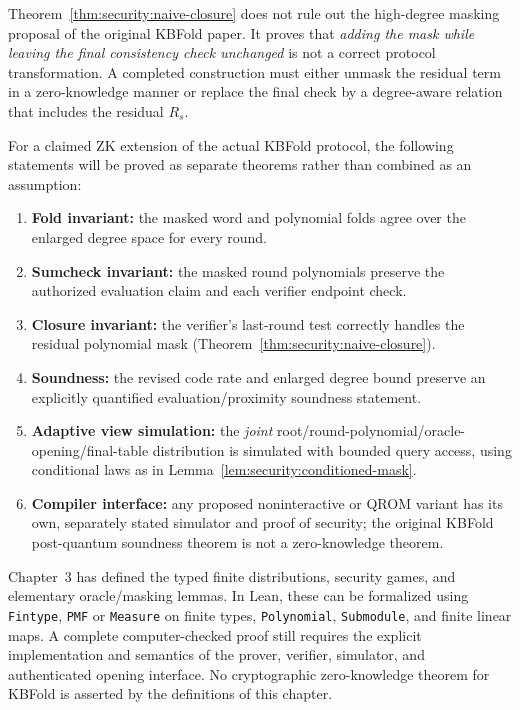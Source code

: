 \begin{remark}
Theorem~\ref{thm:security:naive-closure} does not rule out the high-degree masking proposal of the original KBFold paper. It proves that \emph{adding the mask while leaving the final consistency check unchanged} is not a correct protocol transformation. A completed construction must either unmask the residual term in a zero-knowledge manner or replace the final check by a degree-aware relation that includes the residual $R_s$.
\end{remark}

\begin{definition}\label{def:security:obligation-ledger}
For a claimed ZK extension of the actual KBFold protocol, the following statements will be proved as separate theorems rather than combined as an assumption:
\begin{enumerate}[label=\textup{(\roman*)}]
\item \textbf{Fold invariant:} the masked word and polynomial folds agree over the enlarged degree space for every round.
\item \textbf{Sumcheck invariant:} the masked round polynomials preserve the authorized evaluation claim and each verifier endpoint check.
\item \textbf{Closure invariant:} the verifier's last-round test correctly handles the residual polynomial mask (Theorem~\ref{thm:security:naive-closure}).
\item \textbf{Soundness:} the revised code rate and enlarged degree bound preserve an explicitly quantified evaluation/proximity soundness statement.
\item \textbf{Adaptive view simulation:} the \emph{joint} root/round-polynomial/oracle-opening/final-table distribution is simulated with bounded query access, using conditional laws as in Lemma~\ref{lem:security:conditioned-mask}.
\item \textbf{Compiler interface:} any proposed noninteractive or QROM variant has its own, separately stated simulator and proof of security; the original KBFold post-quantum soundness theorem is not a zero-knowledge theorem.
\end{enumerate}
\end{definition}

\begin{remark}
Chapter~3 has defined the typed finite distributions, security games, and elementary oracle/masking lemmas. In Lean, these can be formalized using \texttt{Fintype}, \texttt{PMF} or \texttt{Measure} on finite types, \texttt{Polynomial}, \texttt{Submodule}, and finite linear maps. A complete computer-checked proof still requires the explicit implementation and semantics of the prover, verifier, simulator, and authenticated opening interface. No cryptographic zero-knowledge theorem for KBFold is asserted by the definitions of this chapter.
\end{remark}
